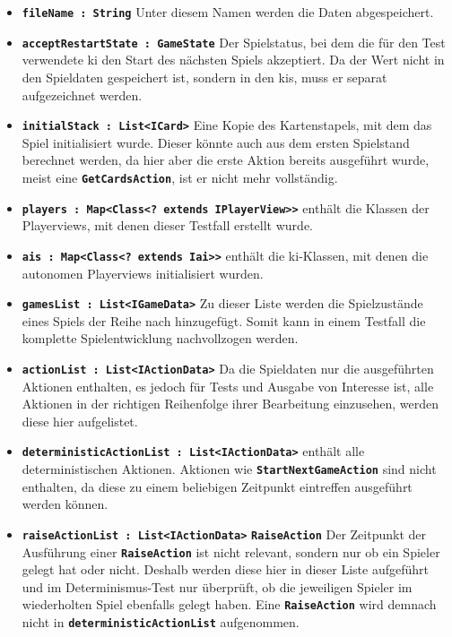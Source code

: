 \documentclass[
							a4paper, 
							11pt, 
							openany, 
							liststotoc,
							parskip=half, 
   							headings=normal
						]{scrreprt}
\begin{document}
{\begin{itemize}
	\item \textbf{\texttt{fileName : String}} Unter diesem Namen werden die Daten abgespeichert. 
	\item \textbf{\texttt{acceptRestartState : GameState}} Der Spielstatus, bei dem die für den Test verwendete \acs{ki} den Start des nächsten Spiels akzeptiert. Da der Wert nicht in den Spieldaten gespeichert ist, sondern in den \acs{ki}s, muss er separat aufgezeichnet werden.
	\item \textbf{\texttt{initialStack : List{\textless}ICard{\textgreater}}} Eine Kopie des Kartenstapels, mit dem das Spiel initialisiert wurde. Dieser könnte auch aus dem ersten Spielstand berechnet werden, da hier aber die erste Aktion bereits ausgeführt wurde, meist eine \textbf{\texttt{GetCardsAction}}, ist er nicht mehr vollständig.
	\item \textbf{\texttt{players : Map{\textless}Class{\textless}? extends IPlayerView{\textgreater}{\textgreater}}} enthält die Klassen der Pla\-yer\-vi\-ews, mit denen dieser Testfall erstellt wurde. 
	\item \textbf{\texttt{ais : Map{\textless}Class{\textless}? extends I\acs{ai}{\textgreater}{\textgreater}}} enthält die \acs{ki}-Klassen, mit denen die autonomen Playerviews initialisiert wurden. 
	\item \textbf{\texttt{gamesList : List{\textless}IGameData{\textgreater}}} Zu dieser Liste werden die Spielzustände eines Spiels der Reihe nach hinzugefügt. Somit kann in einem Testfall die komplette Spielentwicklung nachvollzogen werden.
	\item \textbf{\texttt{actionList : List{\textless}IActionData{\textgreater}}} Da die Spieldaten nur die ausgeführten Aktionen enthalten, es jedoch für Tests und Ausgabe von Interesse ist, alle Aktionen in der richtigen Reihenfolge ihrer Bearbeitung einzusehen, werden diese hier aufgelistet.
	\item \textbf{\texttt{deterministicActionList : List{\textless}IActionData{\textgreater}}} enthält alle de\-ter\-mi\-nis\-ti\-schen Aktionen. Aktionen wie \textbf{\texttt{StartNextGameAction}} sind nicht enthalten, da diese zu einem beliebigen Zeitpunkt eintreffen ausgeführt werden können.
	\item \textbf{\texttt{raiseActionList : List{\textless}IActionData{\textgreater}}} \textbf{\texttt{RaiseAction}} Der Zeitpunkt der Aus\-füh\-rung einer \textbf{\texttt{RaiseAction}} ist nicht relevant, sondern nur ob ein Spieler gelegt hat oder nicht. Deshalb werden diese hier in dieser Liste aufgeführt und im De\-ter\-mi\-nis\-mus\--Test nur überprüft, ob die jeweiligen Spieler im wiederholten Spiel ebenfalls gelegt haben. Eine \textbf{\texttt{RaiseAction}} wird demnach nicht in \textbf{\texttt{deterministicActionList}} aufgenommen.
\end{itemize}

}
\end{document}
